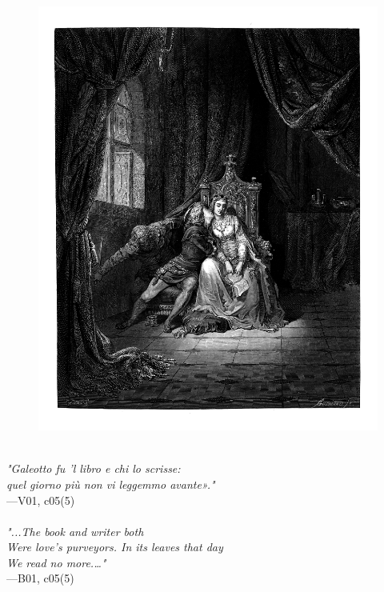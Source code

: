 \documentclass[../Dore_vision.tex]{subfiles}
\begin{document}
\begin{figure}[ht]
\centering
\includegraphics[height=\figsize]{illustrations/book_1/V01, c05(5).jpg}
\end{figure}

\begin{center}
\begin{minipage}{0.8\linewidth}
\textit{\\
"Galeotto fu ’l libro e chi lo scrisse:\\quel giorno più non vi leggemmo avante»."} \\
—V01, c05(5) \\~\\
\textit{"...The book and writer both\\Were love's purveyors. In its leaves that day\\We read no more.\textquotesingle…"} \\
—B01, c05(5)
\end{minipage}
\end{center}

\newpage
\end{document}
